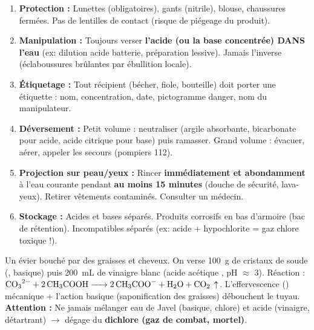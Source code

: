 \documentclass[11pt]{article}
\begin{document}
\begin{methode}
\begin{enumerate}
\item \textbf{Protection :} Lunettes (obligatoires), gants (nitrile), blouse, chaussures fermées. Pas de lentilles de contact (risque de piégeage du produit).
\item \textbf{Manipulation :} Toujours verser \textbf{l'acide (ou la base concentrée) DANS l'eau} (ex: dilution acide batterie, préparation lessive). Jamais l'inverse (éclaboussures brûlantes par ébullition locale).
\item \textbf{Étiquetage :} Tout récipient (bécher, fiole, bouteille) doit porter une étiquette : nom, concentration, date, pictogramme danger, nom du manipulateur.
\item \textbf{Déversement :} Petit volume : neutraliser (argile absorbante, bicarbonate pour acide, acide citrique pour base) puis ramasser. Grand volume : évacuer, aérer, appeler les secours (pompiers 112).
\item \textbf{Projection sur peau/yeux :} Rincer \textbf{immédiatement et abondamment} à l'eau courante pendant \textbf{au moins 15 minutes} (douche de sécurité, lava-yeux). Retirer vêtements contaminés. Consulter un médecin.
\item \textbf{Stockage :} Acides et bases séparés. Produits corrosifs en bas d'armoire (bac de rétention). Incompatibles séparés (ex: acide + hypochlorite = gaz chlore toxique !).
\end{enumerate}
\end{methode}

\begin{exemplebox}
Un évier bouché par des graisses et cheveux. On verse \SI{100}{g} de cristaux de soude (, basique) puis \SI{200}{mL} de vinaigre blanc (acide acétique , pH $\approx$ 3).
Réaction : $\ce{CO3^{2-} + 2 CH3COOH -> 2 CH3COO- + H2O + CO2}\,\uparrow$.
L'effervescence () mécanique + l'action basique (saponification des graisses) débouchent le tuyau. \textbf{Attention :} Ne jamais mélanger eau de Javel (basique, chlore) et acide (vinaigre, détartrant) $\rightarrow$ dégage du \textbf{dichlore  (gaz de combat, mortel)}.
\end{exemplebox}
\end{document}
